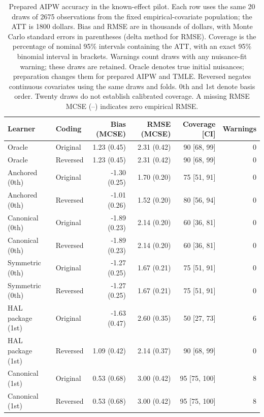 \begin{table}[p]
\centering
\small
\caption{Prepared AIPW accuracy in the known-effect pilot. Each row uses the same 20 draws of 2675 observations from the fixed empirical-covariate population; the ATT is 1800 dollars. Bias and RMSE are in thousands of dollars, with Monte Carlo standard errors in parentheses (delta method for RMSE). Coverage is the percentage of nominal 95\% intervals containing the ATT, with an exact 95\% binomial interval in brackets. Warnings count draws with any nuisance-fit warning; these draws are retained. Oracle denotes true initial nuisances; preparation changes them for prepared AIPW and TMLE. Reversed negates continuous covariates using the same draws and folds. 0th and 1st denote basis order. Twenty draws do not establish calibrated coverage. A missing RMSE MCSE (--) indicates zero empirical RMSE.}
\label{tab:semisynth-aipw}

\begin{tabular}{llrrrr}
\toprule
Learner & Coding & Bias (MCSE) & RMSE (MCSE) & Coverage [CI] & Warnings\\
\midrule
Oracle & Original & 1.23 (0.45) & 2.31 (0.42) & 90 [68, 99] & 0\\
Oracle & Reversed & 1.23 (0.45) & 2.31 (0.42) & 90 [68, 99] & 0\\
\addlinespace
Anchored (0th) & Original & -1.30 (0.25) & 1.70 (0.20) & 75 [51, 91] & 0\\
Anchored (0th) & Reversed & -1.01 (0.26) & 1.52 (0.20) & 80 [56, 94] & 0\\
\addlinespace
Canonical (0th) & Original & -1.89 (0.23) & 2.14 (0.20) & 60 [36, 81] & 0\\
Canonical (0th) & Reversed & -1.89 (0.23) & 2.14 (0.20) & 60 [36, 81] & 0\\
\addlinespace
Symmetric (0th) & Original & -1.27 (0.25) & 1.67 (0.21) & 75 [51, 91] & 0\\
Symmetric (0th) & Reversed & -1.27 (0.25) & 1.67 (0.21) & 75 [51, 91] & 0\\
\addlinespace
HAL package (1st) & Original & -1.63 (0.47) & 2.60 (0.35) & 50 [27, 73] & 6\\
HAL package (1st) & Reversed & 1.09 (0.42) & 2.14 (0.37) & 90 [68, 99] & 0\\
\addlinespace
Canonical (1st) & Original & 0.53 (0.68) & 3.00 (0.42) & 95 [75, 100] & 8\\
Canonical (1st) & Reversed & 0.53 (0.68) & 3.00 (0.42) & 95 [75, 100] & 8\\
\bottomrule
\end{tabular}
\end{table}
